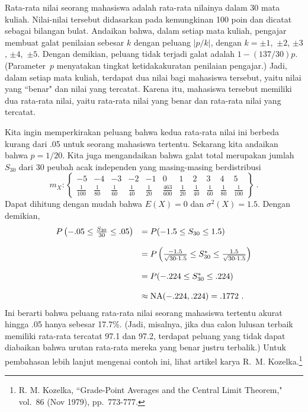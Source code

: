 \begin{example}\label{exam 9.9}
Rata-rata nilai seorang mahasiswa adalah rata-rata nilainya dalam 30
mata kuliah.  Nilai-nilai tersebut didasarkan pada kemungkinan 100 poin dan dicatat sebagai
bilangan bulat.  Andaikan bahwa, dalam setiap mata kuliah, pengajar membuat galat penilaian sebesar
$k$ dengan peluang $|p/k|$, dengan $k = \pm1$,~$\pm2$, $\pm3$, $\pm4$,~$\pm5$.  Dengan demikian,
peluang tidak terjadi galat adalah $1 - (137/30)p$.  (Parameter~$p$ menyatakan tingkat
ketidakakuratan penilaian pengajar.)  Jadi, dalam setiap mata kuliah, terdapat dua nilai bagi
mahasiswa tersebut, yaitu nilai yang ``benar" dan nilai yang tercatat.  Karena itu, mahasiswa
tersebut memiliki dua rata-rata nilai, yaitu rata-rata nilai yang benar dan rata-rata nilai yang
tercatat.
\par
Kita ingin memperkirakan peluang bahwa kedua rata-rata nilai ini berbeda kurang dari .05 untuk
seorang mahasiswa tertentu.  Sekarang kita andaikan bahwa $p = 1/20$.  Kita juga mengandaikan bahwa
galat total merupakan jumlah $S_{30}$ dari 30 peubah acak independen yang masing-masing berdistribusi
$$
m_X: \left\{ 
\begin{array}{ccccccccccc}
-5 & -4 & -3 & -2 & -1 & 0 & 1 & 2 & 3 & 4 & 5 \\
\frac1{100} & \frac1{80} & \frac1{60} & \frac1{40} & \frac1{20} & 
\frac{463}{600} & \frac1{20} & \frac1{40} & \frac1{60} & \frac1{80} &
\frac1{100}
\end{array} 
\right \}\ .
$$
Dapat dihitung dengan mudah bahwa $E(X) = 0$ dan $\sigma^2(X) = 1.5$.  Dengan demikian,
$$\begin{array}{ll}
P\left(-.05 \leq \frac {S_{30}}{30} \leq .05 \right) &= P(-1.5 \leq S_{30} \leq1.5) \\
     & \\
     &= P\left(\frac {-1.5}{\sqrt{30\cdot1.5}} \leq S_{30}^* \leq \frac {1.5}{\sqrt{30\cdot1.5}} \right) \\
     & \\
     &= P(-.224 \leq S_{30}^* \leq .224) \\
     & \\
     &\approx   {\rm NA}(-.224, .224) = .1772\ .  
\end{array}$$
Ini berarti bahwa peluang rata-rata nilai seorang mahasiswa tertentu akurat hingga .05
hanya sebesar 17.7\%.  (Jadi, misalnya, jika dua calon lulusan terbaik memiliki rata-rata tercatat
97.1 dan 97.2, terdapat peluang yang tidak dapat diabaikan bahwa urutan rata-rata mereka yang benar
justru terbalik.)  Untuk pembahasan lebih lanjut mengenai contoh ini, lihat artikel karya R.~M.
Kozelka.\footnote{R. M. Kozelka, ``Grade-Point Averages and the Central Limit
Theorem,"  vol.~86 (Nov 1979), pp.~773-777.}
\end{example}



